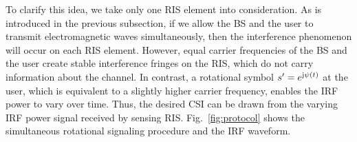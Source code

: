 \documentclass[journal,twocolumn]{IEEEtran}
\theoremstyle{nonumberplain}
\begin{document}
    To clarify this idea, we take only one RIS element into consideration. 
    As is introduced in the previous subsection, if we allow the BS and the user to transmit electromagnetic waves simultaneously, then the interference phenomenon will occur on each RIS element. 
    However, equal carrier frequencies of the BS and the user create stable interference fringes \cite{louradour1993interference} on the RIS, which do not carry information about the channel. 
    In contrast, a rotational symbol $s'=e^{{\rm j}\psi(t)}$ at the user, which is equivalent to a slightly higher carrier frequency, enables the IRF power to vary over time. 
    Thus, the desired CSI can be drawn from the varying IRF power signal received by sensing RIS. 
    Fig.~\ref{fig:protocol} shows the simultaneous rotational signaling procedure and the IRF waveform. 
\end{document}
